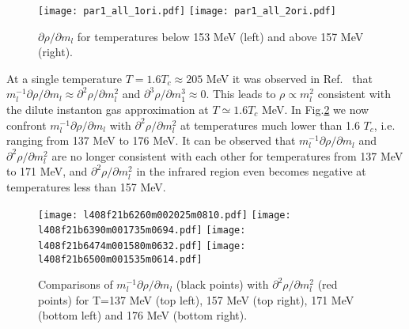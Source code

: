 \documentclass[a4paper,11pt]{article}
\numberwithin{equation}{section}
\begin{document}
\begin{figure}[htbp]
\texttt{[image: par1\_all\_1ori.pdf]}
\texttt{[image: par1\_all\_2ori.pdf]}
\caption{$\partial \rho / \partial m_{l}$ for temperatures below 153 MeV (left) and above 157 MeV (right).}
\label{par1}
\end{figure}



At a single temperature $T=1.6 T_c\approx 205$ MeV it was observed in Ref.~\cite{Ding:2020xlj} that $m_{l}^{-1} \partial \rho / \partial m_{l} \approx \partial^{2} \rho / \partial m_{l}^{2}$ and $\partial^{3} \rho / \partial m_{1}^{3} \approx 0$. This leads to $\rho\propto m_l^2$ consistent with the dilute instanton gas approximation at $T\simeq 1.6 T_c$ MeV.
In Fig.\ref{par2} we now confront $m_{l}^{-1} \partial \rho / \partial m_{l}$ with $\partial^{2} \rho / \partial m_{l}^{2}$ at temperatures much lower than 1.6 $T_c$, i.e. ranging from 137 MeV to 176 MeV. It can be observed that $m_{l}^{-1} \partial \rho / \partial m_{l}$ and $\partial^{2} \rho / \partial m_{l}^{2}$ are no longer consistent with each other for temperatures from 137 MeV to 171 MeV, and $\partial^{2} \rho / \partial m_{l}^{2}$ in the infrared region even becomes negative at temperatures less than 157 MeV. 


\begin{figure}[htbp]
\texttt{[image: l408f21b6260m002025m0810.pdf]}
\texttt{[image: l408f21b6390m001735m0694.pdf]}
\texttt{[image: l408f21b6474m001580m0632.pdf]}
\texttt{[image: l408f21b6500m001535m0614.pdf]}
\caption{Comparisons of $m_{l}^{-1} \partial \rho / \partial m_{l}$ (black points) with $\partial^{2} \rho / \partial m_{l}^{2}$ (red points) for T=137 MeV (top left), 157 MeV (top right), 171 MeV (bottom left) and 176 MeV (bottom right).}
\label{par2}
\end{figure}
\end{document}
